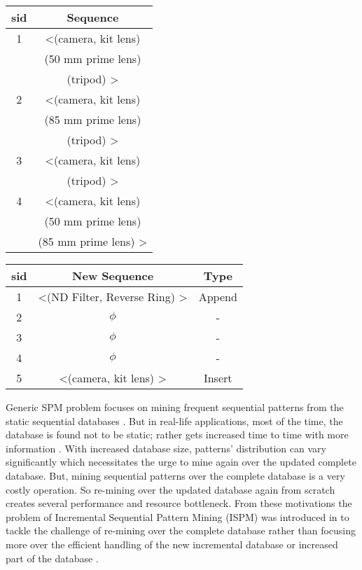 \begin{table*}[!t]
\parbox{.5\linewidth}{
\centering
\begin{tabular}{|c|c|}
\hline
sid & Sequence\\
\hline
1 & \textless (camera, kit lens) \\
& (50 mm prime lens)   \\
& (tripod) \textgreater\\ 
\hline
2 & \textless (camera, kit lens)   \\ 
& (85 mm prime lens) \\ 
& (tripod) \textgreater \\ 
\hline 
3 & \textless (camera, kit lens)\\
& (tripod) \textgreater \\ 
\hline 
4 & \textless (camera, kit lens) \\
& (50 mm prime lens) \\ 
& (85 mm prime lens) \textgreater \\ 
\hline 
\end{tabular}
\caption{Initial Camera Market Dataset} \label{table:example_static_database}
}
\hfill
\parbox{.5\linewidth}{
\centering
\begin{tabular}{|c|c|c|}
\hline
sid & New Sequence & Type\\
\hline
1 & \textless (ND Filter, Reverse Ring) \textgreater & Append\\
\hline
2 & $\phi$ & - \\
\hline 
3 & $\phi$ & - \\
\hline 
4  & $\phi$ & - \\
\hline
5 & \textless (camera, kit lens) \textgreater & Insert\\ 
\hline 
\end{tabular}
\caption{Additional update in Database} \label{table:example_incremental_database}
}
\end{table*}

Generic SPM problem focuses on mining frequent sequential patterns from the static sequential databases
\cite{rizvee2020tree,srikant1996mining,zaki2001spade,han2001prefixspan,fournier2014fast,chen2009updown,perera2008clustering,okolica2018sequence,guidotti2018personalized}. But in real-life applications, most of the time, the database is found not to be static; rather gets increased time to time with more information \cite{mallick2013incremental}. With increased database size, patterns' distribution can vary significantly which necessitates the urge to mine again over the updated complete database. But, mining sequential patterns over the complete database is a very costly operation. So re-mining over the updated database again from scratch creates several performance and resource bottleneck. From these motivations the problem of Incremental Sequential Pattern Mining (ISPM) was introduced in \cite{wang1997discovering} to tackle the challenge of re-mining over the complete database rather than focusing more over the efficient handling of the new incremental database or increased part of the database \cite{mallick2013incremental,slimani2013sequential,fournier2017survey,huang2008general}. 

